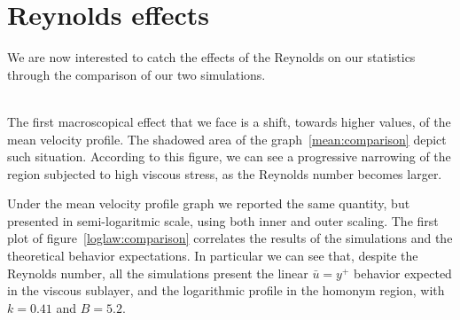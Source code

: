 \section{Reynolds effects}
We are now interested to catch the effects of the Reynolds on our statistics through the comparison of our two simulations.\\~\par
The first macroscopical effect that we face is a shift, towards higher values, of the mean velocity profile. The shadowed area of the graph~\ref{mean:comparison} depict such situation. According to this figure, we can see a progressive narrowing of the region subjected to high viscous stress, as the Reynolds number becomes larger.\par
Under the mean velocity profile graph we reported the same quantity, but presented in semi-logaritmic scale, using both inner and outer scaling.
The first plot of figure~\ref{loglaw:comparison} correlates the results of the simulations and the theoretical behavior expectations.
In particular we can see that, despite the Reynolds number, all the simulations present the linear $\bar{u}=y^{+}$ behavior expected in the viscous sublayer, and the logarithmic profile in the homonym region, with $k=0.41$ and $B=5.2$.\\~\par

